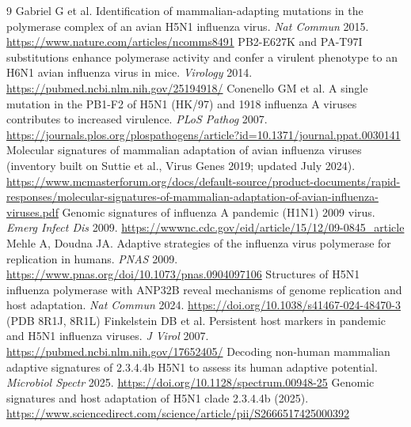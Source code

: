 \documentclass[11pt]{article}
\begin{document}
\begin{thebibliography}{9}\small
{} Gabriel G et al. Identification of mammalian-adapting mutations in the polymerase complex of an avian H5N1 influenza virus. \emph{Nat Commun} 2015. \url{https://www.nature.com/articles/ncomms8491}
 PB2-E627K and PA-T97I substitutions enhance polymerase activity and confer a virulent phenotype to an H6N1 avian influenza virus in mice. \emph{Virology} 2014. \url{https://pubmed.ncbi.nlm.nih.gov/25194918/}
 Conenello GM et al. A single mutation in the PB1-F2 of H5N1 (HK/97) and 1918 influenza A viruses contributes to increased virulence. \emph{PLoS Pathog} 2007. \url{https://journals.plos.org/plospathogens/article?id=10.1371/journal.ppat.0030141}
 Molecular signatures of mammalian adaptation of avian influenza viruses (inventory built on Suttie et al., Virus Genes 2019; updated July 2024). \url{https://www.mcmasterforum.org/docs/default-source/product-documents/rapid-responses/molecular-signatures-of-mammalian-adaptation-of-avian-influenza-viruses.pdf}
 Genomic signatures of influenza A pandemic (H1N1) 2009 virus. \emph{Emerg Infect Dis} 2009. \url{https://wwwnc.cdc.gov/eid/article/15/12/09-0845_article}
 Mehle A, Doudna JA. Adaptive strategies of the influenza virus polymerase for replication in humans. \emph{PNAS} 2009. \url{https://www.pnas.org/doi/10.1073/pnas.0904097106}
 Structures of H5N1 influenza polymerase with ANP32B reveal mechanisms of genome replication and host adaptation. \emph{Nat Commun} 2024. \url{https://doi.org/10.1038/s41467-024-48470-3} (PDB 8R1J, 8R1L)
 Finkelstein DB et al. Persistent host markers in pandemic and H5N1 influenza viruses. \emph{J Virol} 2007. \url{https://pubmed.ncbi.nlm.nih.gov/17652405/}
 Decoding non-human mammalian adaptive signatures of 2.3.4.4b H5N1 to assess its human adaptive potential. \emph{Microbiol Spectr} 2025. \url{https://doi.org/10.1128/spectrum.00948-25}
 Genomic signatures and host adaptation of H5N1 clade 2.3.4.4b (2025). \url{https://www.sciencedirect.com/science/article/pii/S2666517425000392}
\end{thebibliography}
\end{document}
